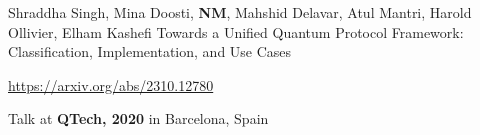 \begin{cventries}
  \cventry
    {Shraddha Singh, Mina Doosti, \textbf{NM}, Mahshid Delavar, Atul Mantri, Harold Ollivier, Elham Kashefi} %
    {Towards a Unified Quantum Protocol Framework: Classification, Implementation, and Use Cases} %
    {} %
    {}
    {
      \begin{cvitems} %
        \item {\href{https://arxiv.org/abs/2310.12780}{https://arxiv.org/abs/2310.12780}}
        \item {Talk at \textbf{QTech, 2020} in Barcelona, Spain}
      \end{cvitems}
    }

\end{cventries}
